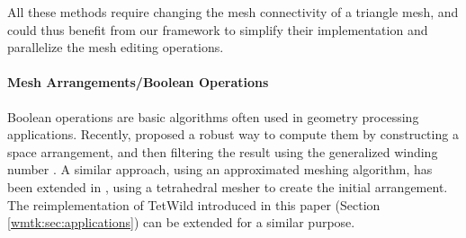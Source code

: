 All these methods require changing the mesh connectivity of a triangle mesh, and could thus benefit from our framework to simplify their implementation and parallelize the mesh editing operations. 

\paragraph{Mesh Arrangements/Boolean Operations} 

Boolean operations are basic algorithms often used in geometry processing applications. Recently, \cite{zhou2016mesh} proposed a robust way to compute them by constructing a space arrangement, and then filtering the result using the generalized winding number \cite{Jacobson:2013}. A similar approach, using an approximated meshing algorithm, has been extended in \cite{Hu:2019:fTetWild}, using a tetrahedral mesher to create the initial arrangement. The reimplementation of TetWild introduced in this paper (Section \ref{wmtk:sec:applications}) can be extended for a similar purpose.

